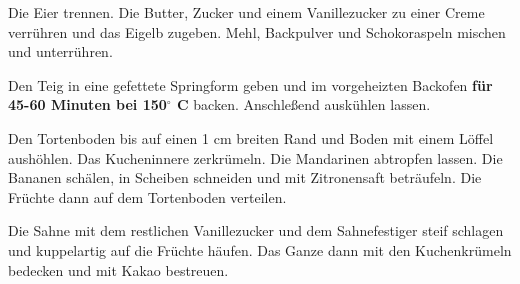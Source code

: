 \vspace*{\fill}
\begin{multicols}{2}


Die Eier trennen. 
Die Butter, Zucker und einem Vanillezucker zu einer Creme verrühren und das Eigelb zugeben.
Mehl, Backpulver und Schokoraspeln mischen und unterrühren.\newline

Den Teig in eine gefettete Springform geben und im vorgeheizten Backofen  \textbf{für 45-60 Minuten bei 150$^\circ$ C} backen. Anschleßend auskühlen lassen.\newline

Den Tortenboden bis auf einen 1 cm breiten Rand und Boden mit einem Löffel aushöhlen.\newline
Das Kucheninnere zerkrümeln. Die Mandarinen abtropfen lassen.
Die Bananen schälen, in Scheiben schneiden und mit Zitronensaft beträufeln. Die Früchte dann auf
dem Tortenboden verteilen.\newline
 
 Die Sahne mit dem restlichen Vanillezucker und dem Sahnefestiger steif schlagen und kuppelartig auf die Früchte häufen. Das Ganze dann mit den Kuchenkrümeln bedecken und mit Kakao bestreuen.


\end{multicols}
\vfill
